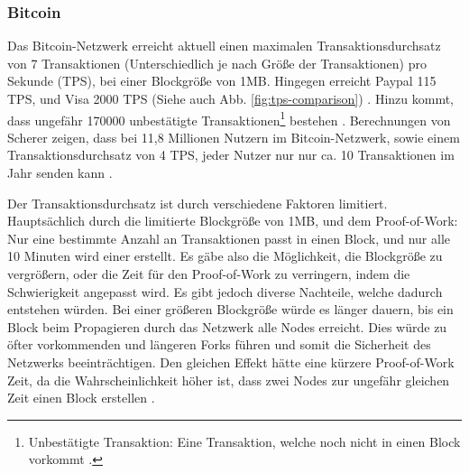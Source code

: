 \subsubsection{Bitcoin}
Das Bitcoin-Netzwerk erreicht aktuell einen maximalen Transaktionsdurchsatz von 7 Transaktionen (Unterschiedlich je nach Größe der Transaktionen) pro Sekunde (TPS), bei einer Blockgröße von 1MB.  Hingegen erreicht Paypal 115 TPS, und Visa 2000 TPS (Siehe auch Abb. \ref{fig:tps-comparison}) \cite{ScalabilityBitcoinWiki}. Hinzu kommt, dass ungefähr 170000 unbestätigte Transaktionen\footnote{Unbestätigte Transaktion: Eine Transaktion, welche noch nicht in einen Block vorkommt \cite{AntonopoulosMasteringbitcoin2015}.} bestehen \cite{BlockchainFirmaBlockchainChartsUnbestatigte}. Berechnungen von Scherer zeigen, dass bei 11,8 Millionen Nutzern im Bitcoin-Netzwerk, sowie einem Transaktionsdurchsatz von 4 TPS, jeder Nutzer nur nur ca. 10 Transaktionen im Jahr senden kann \cite{SchererPerformanceScalabilityBlockchain2017}.

Der Transaktionsdurchsatz ist durch verschiedene Faktoren limitiert. Hauptsächlich durch die limitierte Blockgröße von 1MB, und dem Proof-of-Work: Nur eine bestimmte Anzahl an Transaktionen passt in einen Block, und nur alle 10 Minuten wird einer erstellt. Es gäbe also die Möglichkeit, die Blockgröße zu vergrößern, oder die Zeit für den Proof-of-Work zu verringern, indem die Schwierigkeit angepasst wird. Es gibt jedoch diverse Nachteile, welche dadurch entstehen würden. Bei einer größeren Blockgröße würde es länger dauern, bis ein Block beim Propagieren durch das Netzwerk alle Nodes erreicht. Dies würde zu öfter vorkommenden und längeren Forks führen und somit die Sicherheit des Netzwerks beeinträchtigen. Den gleichen Effekt hätte eine kürzere Proof-of-Work Zeit, da die Wahrscheinlichkeit höher ist, dass zwei Nodes zur ungefähr gleichen Zeit einen Block erstellen \cite{SchererPerformanceScalabilityBlockchain2017} \cite{EthereumWhitepaper2017} \cite{SompolinskyAcceleratingBitcoinTransaction2013}. 

